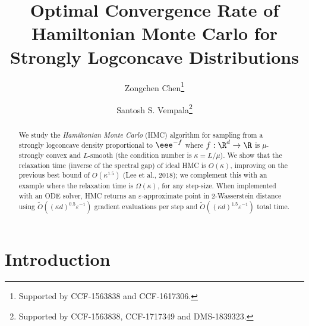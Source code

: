 \documentclass{toc}
\newcommand{\eps}{\varepsilon}
\begin{document}
\begin{frontmatter} %
  
%
%

%
%
%

\title{Optimal Convergence Rate of Hamiltonian Monte Carlo for Strongly
Logconcave Distributions}

%
%
%
%
%
%
%
%
%
%
%
%


%
%
%
%

%

\author[chen]{Zongchen Chen\thanks{Supported by CCF-1563838 and CCF-1617306.}}
\author[vempala]{Santosh S. Vempala\thanks{Supported by CCF-1563838, CCF-1717349 and DMS-1839323.}}

%
%
%
%

%
%
%
%
%
%
\begin{abstract}
We study  %
the \emph{Hamiltonian Monte Carlo} (HMC) algorithm  %
for sampling from a strongly logconcave density proportional 
to $\eee^{-f}$ where $f:\R^d \to \R$ is
$\mu$-strongly convex and $L$-smooth (the condition number is 
$\kappa = L/\mu$). We show that the relaxation time (inverse of 
the spectral gap) of ideal HMC is $O(\kappa)$, improving on the previous
best bound of $O(\kappa^{1.5})$ (Lee et al., 2018); %
we complement this with an example where the relaxation time is $\Omega(\kappa)$, for any step-size. When implemented with an ODE solver, HMC returns an $\eps$-approximate point in 2-Wasserstein distance using $\tilde{O}((\kappa d)^{0.5} \eps^{-1})$ gradient evaluations per step and $\tilde{O}((\kappa d)^{1.5}\eps^{-1})$ total time.
\end{abstract}

%

\end{frontmatter}

%
%
%
















\section{Introduction}
\end{document}
